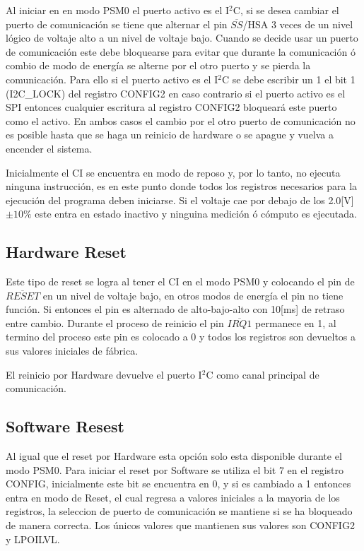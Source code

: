 \documentclass[letterpaper,12pt,oneside]{book}
\begin{document}
			Al iniciar en en modo PSM0 el puerto activo es el I$^2$C, si se desea cambiar el puerto de comunicación se tiene que alternar el pin $\overline{SS}$/HSA 3 veces de un nivel lógico de voltaje alto a un nivel de voltaje bajo. Cuando se decide usar un puerto de comunicación este debe bloquearse para evitar que durante la comunicación ó combio de modo de energía se alterne por el otro puerto y se pierda la comunicación. Para ello si el puerto activo es el I$^2$C se debe escribir un 1 el bit 1 (I2C\_LOCK) del registro CONFIG2 en caso contrario si el puerto activo es el SPI entonces cualquier escritura al registro CONFIG2 bloqueará este puerto como el activo. En ambos casos el cambio por el otro puerto de comunicación no es posible hasta que se haga un reinicio de hardware o se apague y vuelva a encender el sistema.

			Inicialmente el CI se encuentra en modo de reposo y, por lo tanto, no ejecuta ninguna instrucción, es en este punto donde todos los registros necesarios para la ejecución del programa deben iniciarse. Si el voltaje cae por debajo de los 2.0[V]$\pm10\%$ este entra en estado inactivo y ninguina medición ó cómputo es ejecutada.

			\subsection{Hardware Reset}
			Este tipo de reset se logra al tener el CI en el modo PSM0 y colocando el pin de $\overline{RESET}$ en un nivel de voltaje bajo, en otros modos de energía el pin no tiene función. Si entonces el pin es alternado de alto-bajo-alto con 10[ms] de retraso entre cambio. Durante el proceso de reinicio el pin $\overline{IRQ1}$ permanece en 1, al termino del proceso este pin es colocado a 0 y todos los registros son devueltos a sus valores iniciales de fábrica. 

			El reinicio por Hardware devuelve el puerto I$^2$C como canal principal de comunicación.

			\subsection{Software Resest}
			Al igual que el reset por Hardware esta opción solo esta disponible durante el modo PSM0. Para iniciar el reset por Software se utiliza el bit 7 en el registro CONFIG, inicialmente este bit se encuentra en 0, y si es cambiado a 1 entonces entra en modo de Reset, el cual regresa a valores iniciales a la mayoria de los registros, la seleccion de puerto de comunicación se mantiene si se ha bloqueado de manera correcta. Los únicos valores que mantienen sus valores son CONFIG2 y LPOILVL.
\end{document}
